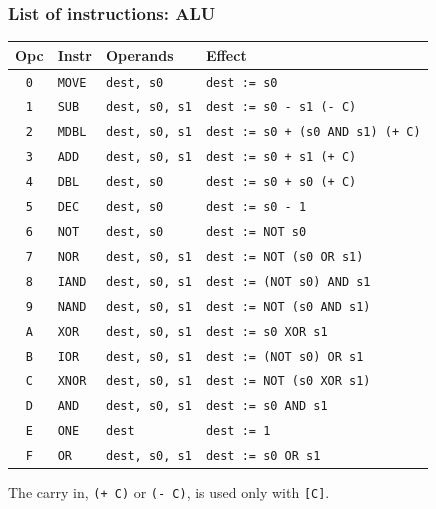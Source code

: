 \documentclass{beamer}
\newcommand{\code}[1]{\texttt{#1}}
\begin{document}
   \begin{frame}
    \frametitle{List of instructions: ALU}
    {\small
    \begin{center}
     \begin{tabular}{|c|ll|l|}
      \hline
       Opc&Instr&Operands&Effect\\
      \hline
       \code{0}&\code{MOVE}&\code{dest, s0}&\code{dest := s0}\\
       \code{1}&\code{SUB}&\code{dest, s0, s1}&\code{dest := s0 - s1 (- C)}\\
       \code{2}&\code{MDBL}&\code{dest, s0, s1}&\code{dest := s0 + (s0 AND s1) (+ C)}\\
       \code{3}&\code{ADD}&\code{dest, s0, s1}&\code{dest := s0 + s1 (+ C)}\\
       \code{4}&\code{DBL}&\code{dest, s0}&\code{dest := s0 + s0 (+ C)}\\
       \code{5}&\code{DEC}&\code{dest, s0}&\code{dest := s0 - 1}\\
       \code{6}&\code{NOT}&\code{dest, s0}&\code{dest := NOT s0}\\
       \code{7}&\code{NOR}&\code{dest, s0, s1}&\code{dest := NOT (s0 OR s1)}\\
       \code{8}&\code{IAND}&\code{dest, s0, s1}&\code{dest := (NOT s0) AND s1}\\
       \code{9}&\code{NAND}&\code{dest, s0, s1}&\code{dest := NOT (s0 AND s1)}\\
       \code{A}&\code{XOR}&\code{dest, s0, s1}&\code{dest := s0 XOR s1}\\
       \code{B}&\code{IOR}&\code{dest, s0, s1}&\code{dest := (NOT s0) OR s1}\\
       \code{C}&\code{XNOR}&\code{dest, s0, s1}&\code{dest := NOT (s0 XOR s1)}\\
       \code{D}&\code{AND}&\code{dest, s0, s1}&\code{dest := s0 AND s1}\\
       \code{E}&\code{ONE}&\code{dest}&\code{dest := 1}\\
       \code{F}&\code{OR}&\code{dest, s0, s1}&\code{dest := s0 OR s1}\\
      \hline
     \end{tabular}
    \end{center}
    }
    The carry in, \code{(+ C)} or \code{(- C)}, is used only with
    \code{[C]}.
   \end{frame}
%
\end{document}
